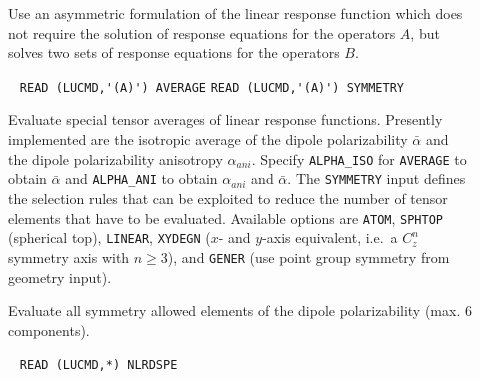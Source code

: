 \begin{center}
\end{center}

\begin{description}
\item[] 
Use an asymmetric formulation of the linear response function which
does not require the solution of response equations for the operators $A$, 
but solves two sets of response equations for the operators $B$.
%
%
%
\item[] \verb| |\newline
   \verb|READ (LUCMD,'(A)') AVERAGE|\newline
   \verb|READ (LUCMD,'(A)') SYMMETRY|

Evaluate special tensor averages of linear response functions.
Presently implemented are the isotropic average of the dipole polarizability
$\bar{\alpha}$ and the dipole polarizability anisotropy $\alpha_{ani}$.
Specify \verb+ALPHA_ISO+ for \verb+AVERAGE+ to obtain $\bar{\alpha}$ and
\verb+ALPHA_ANI+ to obtain $\alpha_{ani}$ and $\bar{\alpha}$.
The \verb+SYMMETRY+ input defines the selection rules that can be
exploited to reduce the number of tensor elements that have to be
evaluated. Available options are
\verb+ATOM+, \verb+SPHTOP+ (spherical top), \verb+LINEAR+,
\verb+XYDEGN+ ($x$- and $y$-axis equivalent, i.e.\ a $C_z^n$
symmetry axis with $n \ge 3$),  and \verb+GENER+ (use point
group symmetry from geometry input).
 
\item[] 
Evaluate all symmetry allowed elements of the dipole polarizability
(max. 6 components).

\item[] \verb| |\newline
   \verb|READ (LUCMD,*) NLRDSPE|


\end{description}
